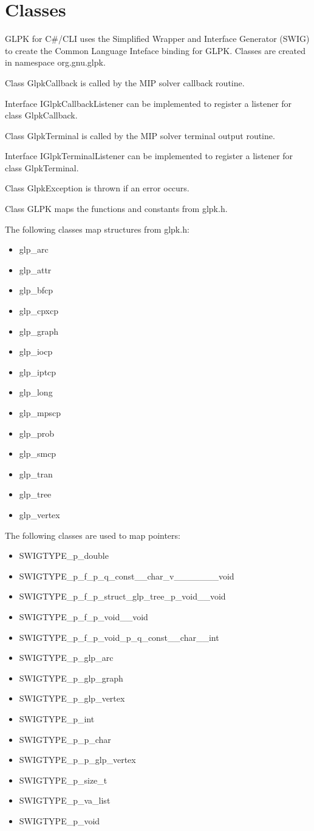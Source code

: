 \documentclass[a4paper,11pt]{report}
\begin{document}
\chapter{Classes}
GLPK for C\#/CLI uses the Simplified Wrapper and Interface Generator
(SWIG)\cite{SWIG} to create
the Common Language Inteface binding for GLPK.
Classes are created in namespace org.gnu.glpk.

Class GlpkCallback is called by the MIP solver callback routine.

Interface IGlpkCallbackListener can be implemented to register a listener for
class GlpkCallback.

Class GlpkTerminal is called by the MIP solver terminal output routine.

Interface IGlpkTerminalListener can be implemented to register a listener for
class GlpkTerminal.

Class GlpkException is thrown if an error occurs.

Class GLPK maps the functions and constants from glpk.h.

The following classes map structures from glpk.h:
\begin{itemize}
\item glp\_arc
\item glp\_attr
\item glp\_bfcp
\item glp\_cpxcp
\item glp\_graph
\item glp\_iocp
\item glp\_iptcp
\item glp\_long
\item glp\_mpscp
\item glp\_prob
\item glp\_smcp
\item glp\_tran
\item glp\_tree
\item glp\_vertex
\end{itemize}

The following classes are used to map pointers:
\begin{itemize}
\item SWIGTYPE\_p\_double
\item SWIGTYPE\_p\_f\_p\_q\_const\_\_char\_v\_\_\_\_\_\_\_void
\item SWIGTYPE\_p\_f\_p\_struct\_glp\_tree\_p\_void\_\_void
\item SWIGTYPE\_p\_f\_p\_void\_\_void
\item SWIGTYPE\_p\_f\_p\_void\_p\_q\_const\_\_char\_\_int
\item SWIGTYPE\_p\_glp\_arc
\item SWIGTYPE\_p\_glp\_graph
\item SWIGTYPE\_p\_glp\_vertex
\item SWIGTYPE\_p\_int
\item SWIGTYPE\_p\_p\_char
\item SWIGTYPE\_p\_p\_glp\_vertex
\item SWIGTYPE\_p\_size\_t
\item SWIGTYPE\_p\_va\_list
\item SWIGTYPE\_p\_void
\end{itemize}
\end{document}
